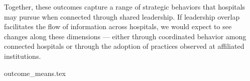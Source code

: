 \documentclass[12pt]{article}
\begin{document}
    Together, these outcomes capture a range of strategic behaviors that hospitals may pursue when connected through shared leadership. If leadership overlap facilitates the flow of information across hospitals, we would expect to see changes along these dimensions — either through coordinated behavior among connected hospitals or through the adoption of practices observed at affiliated institutions. 

    {outcome_means.tex}

    


    
\end{document}
